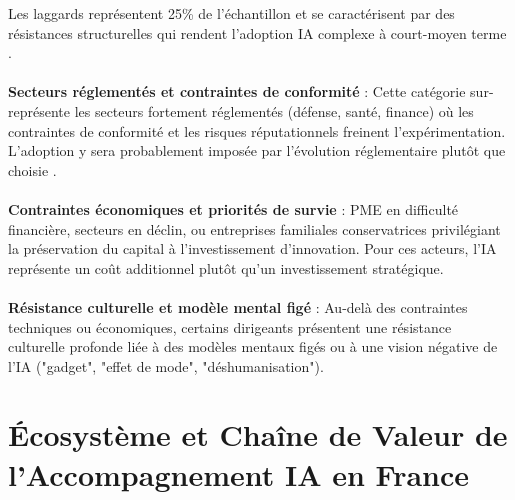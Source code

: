 Les laggards représentent 25\% de l'échantillon et se caractérisent par des résistances structurelles qui rendent l'adoption IA complexe à court-moyen terme \cite{rogers2003diffusion}.
\\\\
\textbf{Secteurs réglementés et contraintes de conformité} : Cette catégorie sur-représente les secteurs fortement réglementés (défense, santé, finance) où les contraintes de conformité et les risques réputationnels freinent l'expérimentation. L'adoption y sera probablement imposée par l'évolution réglementaire plutôt que choisie \cite{bertolucci2024artificial}.
\\\\
\textbf{Contraintes économiques et priorités de survie} : PME en difficulté financière, secteurs en déclin, ou entreprises familiales conservatrices privilégiant la préservation du capital à l'investissement d'innovation. Pour ces acteurs, l'IA représente un coût additionnel plutôt qu'un investissement stratégique.
\\\\
\textbf{Résistance culturelle et modèle mental figé} : Au-delà des contraintes techniques ou économiques, certains dirigeants présentent une résistance culturelle profonde liée à des modèles mentaux figés ou à une vision négative de l'IA ("gadget", "effet de mode", "déshumanisation").

\section{Écosystème et Chaîne de Valeur de l'Accompagnement IA en France}
\label{sec:value_chain}

